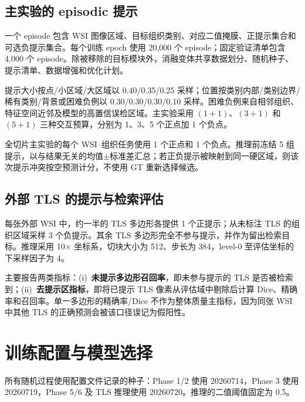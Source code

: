 \documentclass[11pt,letterpaper]{ctexart}
\begin{document}
\subsection{主实验的 episodic 提示}
一个 episode 包含 WSI 图像区域、目标组织类别、对应二值掩膜、正提示集合和可选负提示集合。每个训练 epoch 使用 20,000 个 episode；固定验证清单包含 4,000 个 episode。除被移除的目标模块外，消融变体共享数据划分、随机种子、提示清单、数据增强和优化计划。

提示大小按点/小区域/大区域以 0.40/0.35/0.25 采样；位置按类别内部/类别边界/稀有类别/背景或困难负例以 0.30/0.30/0.30/0.10 采样。困难负例来自相邻组织、特征空间近邻及模型的高置信误检区域。主实验采用 $(1+1)$、$(3+1)$ 和 $(5+1)$ 三种交互预算，分别为 1、3、5 个正点加 1 个负点。

全切片主实验的每个 WSI--组织任务使用 1 个正点和 1 个负点。推理前冻结 5 组提示，以与结果无关的均值$\pm$标准差汇总；若正负提示被映射到同一硬区域，则该次提示冲突按空预测计分，不使用 GT 重新选择候选。

\subsection{外部 TLS 的提示与检索评估}
每张外部 WSI 中，约一半的 TLS 多边形各提供 1 个正提示；从未标注 TLS 的组织区域采样 3 个负提示。其余 TLS 多边形完全不参与提示，并作为留出检索目标。推理采用 10$\times$ 坐标系，切块大小为 512、步长为 384，level-0 至评估坐标的下采样因子为 4。

主要报告两类指标：(i)~\textbf{未提示多边形召回率}，即未参与提示的 TLS 是否被检索到；(ii)~\textbf{去提示区指标}，即将已提示 TLS 像素从评估域中剔除后计算 Dice、精确率和召回率。单一多边形的精确率/Dice 不作为整体质量主指标，因为同张 WSI 中其他 TLS 的正确预测会被该口径误记为假阳性。

\section{训练配置与模型选择}
所有随机过程使用配置文件记录的种子：Phase 1/2 使用 20260714，Phase 3 使用 20260719，Phase 5/6 及 TLS 推理使用 20260720。推理的二值阈值固定为 0.5。
\end{document}
